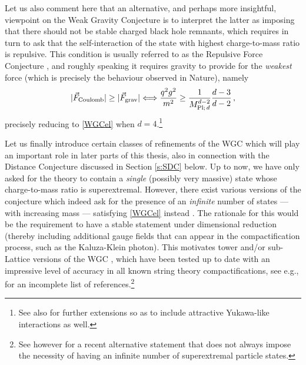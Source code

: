 Let us also comment here that an alternative, and perhaps more insightful, viewpoint on the Weak Gravity Conjecture is to interpret the latter as imposing that there should not be stable charged black hole remnants, which requires in turn to ask that the self-interaction of the state with highest charge-to-mass ratio is repulsive. This condition is usually referred to as the Repulsive Force Conjecture \cite{Palti:2017elp,Heidenreich:2019zkl, Lee:2018spm}, and roughly speaking it requires gravity to provide for the \emph{weakest} force (which is precisely the behaviour observed in Nature), namely
%
\begin{align}\label{CoulombGrav}
 |\vec{F}_\text{Coulomb}|  \geq |\vec{F}_\text{grav}| \Longleftrightarrow \frac{q^2 g^2}{m^2} \geq \frac{1}{M_{\text{Pl;}\, d}^{d-2}} \frac{d-3}{d-2}\, ,
\end{align}
%
precisely reducing to \eqref{WGCel} when $d=4$.\footnote{See also \cite{Palti_2017,Lee:2018spm,Gonzalo:2019gjp,Gonzalo:2020kke} for further extensions so as to include attractive Yukawa-like interactions as well.}

Let us finally introduce certain classes of refinements of the WGC which will play an important role in later parts of this thesis, also in connection with the Distance Conjecture discussed in Section \ref{s:SDC} below. Up to now, we have only asked for the theory to contain a \emph{single} (possibly very massive) state whose charge-to-mass ratio is superextremal. However, there exist various versions of the conjecture which indeed ask for the presence of an \emph{infinite} number of states --- with increasing mass --- satisfying \eqref{WGCel} instead \cite{Cheung:2014vva, Heidenreich:2015nta, Heidenreich:2016aqi,Montero:2016tif}. The rationale for this would be the requirement to have a stable statement under dimensional reduction (thereby including additional gauge fields that can appear in the compactification process, such as the Kaluza-Klein photon). This motivates tower \cite{Andriolo:2018lvp} and/or sub-Lattice versions of the WGC \cite{Heidenreich:2015nta, Heidenreich:2016aqi}, which have been tested up to date with an impressive level of accuracy in all known string theory compactifications, see e.g., \cite{Lee:2018urn,Lee:2019tst,Lee:2019skh,Lee:2019xtm,Heidenreich:2019bjd,Klaewer:2020lfg,Alim:2021vhs,Heidenreich:2021yda,Gendler:2022ztv,Cota:2022yjw,Cota:2022maf,Heidenreich:2024dmr} for an incomplete list of references.\footnote{See however \cite{Cota:2023uir} for a recent alternative statement that does not always impose the necessity of having an infinite number of superextremal particle states.}

